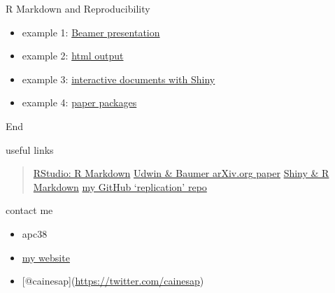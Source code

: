 \documentclass[ignorenonframetext,]{beamer}
\begin{document}
\begin{frame}{R Markdown and Reproducibility}

\begin{itemize}[<+->]
\itemsep1pt\parskip0pt
\item
  example 1:
  \href{https://github.com/cainesap/replication/blob/master/slides.Rmd}{Beamer
  presentation}
\item
  example 2: \href{}{html output}
\item
  example 3: \href{}{interactive documents with Shiny}
\item
  example 4:
  \href{http://openscience.uni-leipzig.de/index.php/mr2/article/view/41}{paper
  packages}
\end{itemize}

\end{frame}

\begin{frame}{End}

\begin{block}{useful links}

\begin{quote}
\href{http://rmarkdown.rstudio.com/}{RStudio: R Markdown}
\href{http://arxiv.org/abs/1501.01613}{Udwin \& Baumer arXiv.org paper}
\href{http://shiny.rstudio.com/articles/rmarkdown.html}{Shiny \& R
Markdown} \href{https://github.com/cainesap/replication}{my GitHub
`replication' repo}
\end{quote}

\end{block}

\begin{block}{contact me}

\begin{itemize}
\itemsep1pt\parskip0pt
\item
  apc38
\item
  \href{http://apc38.user.srcf.net/}{my website}
\item
  {[}@cainesap{]}(\url{https://twitter.com/cainesap})
\end{itemize}

\end{block}

\end{frame}
\end{document}
